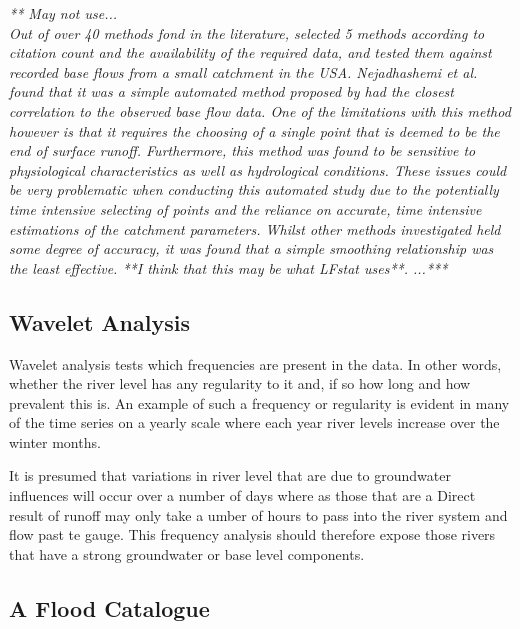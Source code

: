 \documentclass[DIV=calc, paper=a4, fontsize=11pt, twocolumn]{scrartcl}	 %
\begin{document}
\textit{** May not use...\\
Out of over 40 methods fond in the literature, \citet{Nejadhashemi2009} selected 5 methods according to citation count and the availability of the required data, and tested them against recorded base flows from a small catchment in the USA. Nejadhashemi et al. found that it was a simple automated method proposed by \citet{Boughton1988} had the closest correlation to the observed base flow data. One of the limitations with this method however is that it requires the choosing of a single point that is deemed to be the end of surface runoff. Furthermore, this method was found to be sensitive to physiological characteristics as well as hydrological conditions. These issues could be very problematic when conducting this automated study due to the potentially time intensive selecting of points and the reliance on accurate, time intensive estimations of the catchment parameters. Whilst other methods investigated held some degree of accuracy, it was found that a simple smoothing relationship was the least effective. **I think that this may be what LFstat uses**. ...***}



	\subsection{Wavelet Analysis}
Wavelet analysis tests which frequencies are present in the data. In other words, whether the river level has any regularity to it and, if so how long and how prevalent this is. An example of such a frequency or regularity is evident in many of the time series on a yearly scale  where each year river levels increase over the winter months.

It is presumed that variations in river level that are due to groundwater influences will occur over a number of days where as those that are a Direct result of runoff may only take a umber of hours to pass into the river system and flow past te gauge. This frequency analysis should therefore expose those rivers that have a strong groundwater or base level components.

	\subsection{A Flood Catalogue}
\end{document}
